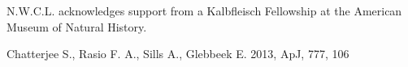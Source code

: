 \documentclass{aastex62}
\begin{document}
\acknowledgments

N.W.C.L. acknowledges support from a Kalbfleisch Fellowship at the American Museum of Natural History.  

\begin{thebibliography}{}

 Chatterjee S., Rasio F. A., Sills A., Glebbeek E. 2013, ApJ, 777, 106  

\end{thebibliography}
\end{document}
